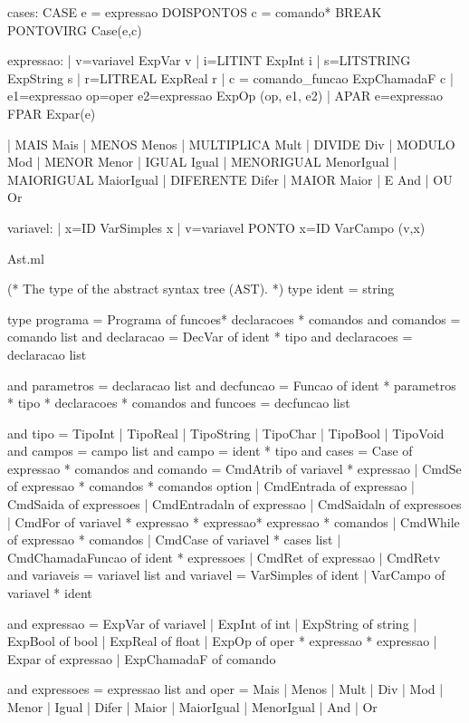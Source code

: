 \documentclass[12pt,a4paper,twoside]{article}
\begin{document}
\begin{terminal}
cases:  CASE e = expressao DOISPONTOS c = comando* BREAK PONTOVIRG {Case(e,c)}

expressao:
			| v=variavel 						{ ExpVar v				}
			| i=LITINT							{ ExpInt i				}
			| s=LITSTRING 						{ ExpString s 			}
			| r=LITREAL							{ ExpReal r				}
			| c = comando_funcao				{ ExpChamadaF c 		}
			| e1=expressao op=oper e2=expressao { ExpOp (op, e1, e2) 	}
			| APAR e=expressao FPAR 			{ Expar(e) 				}

			| MAIS 				{ Mais 		}
			| MENOS 			{ Menos 	}
			| MULTIPLICA		{ Mult 		}
			| DIVIDE			{ Div		}
			| MODULO			{ Mod		}
			| MENOR 			{ Menor 	}
			| IGUAL 			{ Igual 	}
			| MENORIGUAL 		{ MenorIgual}
			| MAIORIGUAL 		{ MaiorIgual}
			| DIFERENTE 		{ Difer 	}
			| MAIOR 			{ Maior 	}
			| E 				{ And 		}
			| OU				{ Or 		}

variavel:
			| x=ID				{ VarSimples x }
			| v=variavel PONTO x=ID { VarCampo (v,x) }
\end{terminal}

Ast.ml
\begin{terminal}
(* The type of the abstract syntax tree (AST). *)
type ident = string

type programa = Programa of funcoes* declaracoes *  comandos
and comandos = comando list
and declaracao = DecVar of ident * tipo
and declaracoes = declaracao list

and parametros = declaracao list
and decfuncao = Funcao	of ident * parametros * tipo * declaracoes * comandos
and funcoes = decfuncao list

and tipo = TipoInt
          | TipoReal
          | TipoString
          | TipoChar
          | TipoBool
					| TipoVoid
and campos = campo list
and campo = ident * tipo
and cases = Case of expressao * comandos 
and comando = CmdAtrib 					of variavel * expressao
				| CmdSe 				of expressao * comandos * comandos option
				| CmdEntrada 			of expressao
				| CmdSaida 				of expressoes
				| CmdEntradaln 			of expressao
				| CmdSaidaln 			of expressoes
				| CmdFor 				of variavel * expressao * expressao* expressao * comandos
				| CmdWhile 				of expressao * comandos
				| CmdCase 				of variavel * cases list
				| CmdChamadaFuncao 		of ident * expressoes
				| CmdRet					of expressao
				| CmdRetv					
and variaveis = variavel list
and variavel = VarSimples of ident
              | VarCampo of variavel * ident

and expressao =   ExpVar of variavel
				| ExpInt of int
				| ExpString of string
				| ExpBool of bool
				| ExpReal of float
				| ExpOp of oper * expressao * expressao
				| Expar of expressao
				| ExpChamadaF of comando

and expressoes = expressao list
and oper = 	  Mais
			| Menos
			| Mult
			| Div
			| Mod
			| Menor
			| Igual
			| Difer
			| Maior
			| MaiorIgual
			| MenorIgual
			| And
			| Or
\end{terminal}
\end{document}
